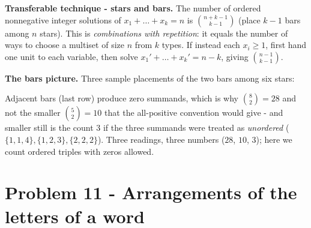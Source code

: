 \documentclass[11pt,a4paper]{article}
\begin{document}
\begin{methodbox}
\textbf{Transferable technique - stars and bars.} The number of ordered nonnegative integer
solutions of $x_1+\dots+x_k=n$ is $\binom{n+k-1}{k-1}$ (place $k-1$ bars among $n$ stars). This is
\emph{combinations with repetition}: it equals the number of ways to choose a multiset of size $n$
from $k$ types. If instead each $x_i\ge 1$, first hand one unit to each variable, then solve
$x_1'+\dots+x_k'=n-k$, giving $\binom{n-1}{k-1}$.
\end{methodbox}

\medskip
\textbf{The bars picture.} Three sample placements of the two bars among six stars:

\begin{center}
\end{center}
Adjacent bars (last row) produce zero summands, which is why $\binom{8}{2}=28$ and not the smaller
$\binom{5}{2}=10$ that the all-positive convention would give - and smaller still is the count $3$ if
the three summands were treated as \emph{unordered} ($\{1,1,4\},\{1,2,3\},\{2,2,2\}$). Three
readings, three numbers ($28$, $10$, $3$); here we count ordered triples with zeros allowed.

\section*{Problem 11 - Arrangements of the letters of a word}
\end{document}
